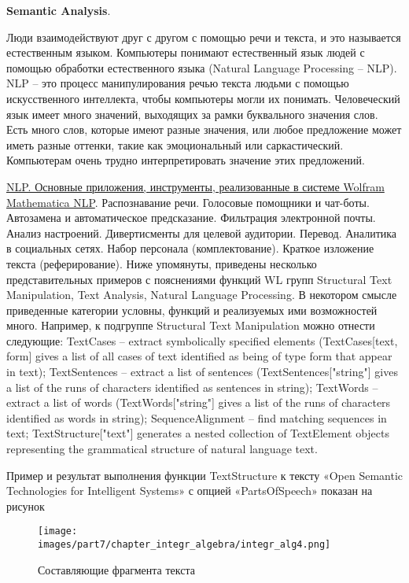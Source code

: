\textbf{Semantic Analysis}. 

Люди взаимодействуют друг с другом с помощью речи и текста, и это называется естественным языком. Компьютеры понимают естественный язык людей с помощью обработки естественного языка (Natural Language Processing -- NLP).
NLP -- это процесс манипулирования речью текста людьми с помощью искусственного интеллекта, чтобы компьютеры могли их понимать. 
Человеческий язык имеет много значений, выходящих за рамки буквального значения слов. Есть много слов, которые имеют разные значения, или любое предложение может иметь разные оттенки, такие как эмоциональный или саркастический. Компьютерам очень трудно интерпретировать значение этих предложений. 

\underline{NLP. Основные приложения, инструменты, реализованные в системе Wolfram Mathematica NLP}.
Распознавание речи. Голосовые помощники и чат-боты. Автозамена и автоматическое предсказание. Фильтрация электронной почты. Анализ настроений. Дивертисменты для целевой аудитории. Перевод. Аналитика в социальных сетях. Набор персонала (комплектование). Краткое изложение текста (реферирование). 
Ниже упомянуты, приведены несколько представительных примеров с пояснениями функций WL групп Structural Text Manipulation, Text Analysis, Natural Language Processing. 
В некотором смысле приведенные категории условны, функций и реализуемых ими возможностей много. Например, к подгруппе Structural Text Manipulation можно отнести следующие: 
TextCases – extract symbolically specified elements (TextCases[text, form] gives a list of all cases of text identified as being of type form that appear in text); TextSentences – extract a list of sentences (TextSentences["string"] gives a list of the runs of characters identified as sentences in string); TextWords – extract a list of words (TextWords["string"] gives a list of the runs of characters identified as words in string); SequenceAlignment – find matching sequences in text; TextStructure["text"] generates a nested collection of TextElement objects representing the grammatical structure of natural language text.

Пример и результат выполнения функции TextStructure к тексту «Open Semantic Technologies for Intelligent Systems» с опцией «PartsOfSpeech» показан на рисунок \textit{}
\begin{figure}[h]
	\centering
	\texttt{[image: images/part7/chapter\_integr\_algebra/integr\_alg4.png]}
	\caption{Составляющие фрагмента текста}
	\label{fig:integr_alg4}
\end{figure}

